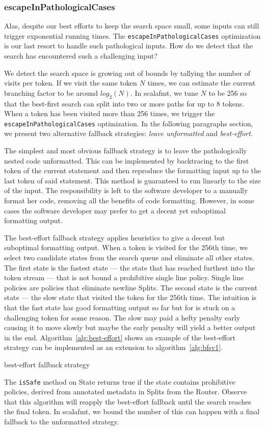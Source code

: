 \subsubsection{escapeInPathologicalCases}\label{sec:escape}
Alas, despite our best efforts to keep the search space small, some inputs can still trigger exponential running times.
The \texttt{escapeInPathologicalCases} optimization is our last resort to handle such pathological inputs.
How do we detect that the search has encountered such a challenging input?

We detect the search space is growing out of bounds by tallying the number of visits per token.
If we visit the same token $N$ times, we can estimate the current branching factor to be around $log_2(N)$.
In scalafmt, we tune $N$ to be 256 so that the best-first search can split into two or more paths for up to 8 tokens.
When a token has been visited more than 256 times, we trigger the \texttt{escapeInPathologicalCases} optimization.
In the following paragraphs section, we present two alternative fallback strategies: \emph{leave unformatted} and \emph{best-effort}.

The simplest and most obvious fallback strategy is to leave the pathologically nested code unformatted.
This can be implemented by backtracing to the first token of the current statement and then reproduce the formatting input up to the last token of said statement.
This method is guaranteed to run linearly to the size of the input.
The responsibility is left to the software developer to a manually format her code, removing all the benefits of code formatting.
However, in some cases the software developer may prefer to get a decent yet suboptimal formatting output.

The best-effort fallback strategy applies heuristics to give a decent but suboptimal formatting output.
When a token is visited for the 256th time, we select two candidate states from the search queue and eliminate all other states.
The first state is the fastest state --- the state that has reached furthest into the token stream --- that is not bound a prohibitive single line policy.
Single line policies are policies that eliminate newline Splits.
The second state is the current state --- the slow state that visited the token for the 256th time.
The intuition is that the fast state has good formatting output so far but for is stuck on a challenging token for some reason.
The slow may paid a hefty penalty early causing it to move slowly but maybe the early penalty will yield a better output in the end.
Algorithm~\ref{alg:best-effort} shows an example of the best-effort strategy can be implemented as an extension to algorithm~\ref{alg:bfsv1}.
\begin{algorithm}
  \caption{best-effort fallback strategy}\label{alg:best-effort}
  
\end{algorithm}
The \texttt{isSafe} method on State returns true if the state contains prohibitive policies, derived from annotated metadata in Splits from the Router.
Observe that this algorithm will reapply the best-effort fallback until the search reaches the final token.
In scalafmt, we bound the number of this can happen with a final fallback to the unformatted strategy.

